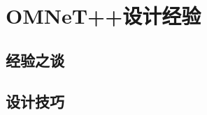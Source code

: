\chapter{OMNeT++设计经验}

\begin{summary}
  \blindtext
\end{summary}

\section{经验之谈}
\Blindtext

\section{设计技巧}
\Blindtext






